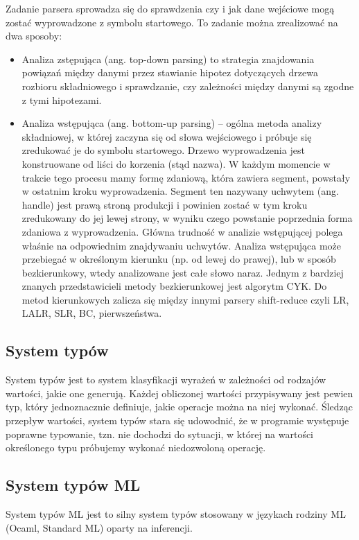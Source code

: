 \documentclass{article}
\begin{document}
\newpage
Zadanie parsera sprowadza się do sprawdzenia czy i jak dane wejściowe mogą zostać wyprowadzone z symbolu startowego. To zadanie można zrealizować na dwa sposoby:


\begin{itemize}
  \item Analiza zstępująca (ang. top-down parsing) to strategia znajdowania powiązań między danymi przez stawianie hipotez dotyczących drzewa rozbioru składniowego i sprawdzanie, czy zależności między danymi są zgodne z tymi hipotezami.
  \item Analiza wstępująca (ang. bottom-up parsing) – ogólna metoda analizy składniowej, w której zaczyna się od słowa wejściowego i próbuje się zredukować je do symbolu startowego. Drzewo wyprowadzenia jest konstruowane od liści do korzenia (stąd nazwa). W każdym momencie w trakcie tego procesu mamy formę zdaniową, która zawiera segment, powstały w ostatnim kroku wyprowadzenia. Segment ten nazywany uchwytem (ang. handle) jest prawą stroną produkcji i powinien zostać w tym kroku zredukowany do jej lewej strony, w wyniku czego powstanie poprzednia forma zdaniowa z wyprowadzenia. Główna trudność w analizie wstępującej polega właśnie na odpowiednim znajdywaniu uchwytów.
        Analiza wstępująca może przebiegać w określonym kierunku (np. od lewej do prawej), lub w sposób bezkierunkowy, wtedy analizowane jest całe słowo naraz. Jednym z bardziej znanych przedstawicieli metody bezkierunkowej jest algorytm CYK. Do metod kierunkowych zalicza się między innymi parsery shift-reduce czyli LR, LALR, SLR, BC, pierwszeństwa.
\end{itemize}



\subsection{System typów}
System typów jest to system klasyfikacji wyrażeń w zależności od rodzajów wartości, jakie one generują\cite{Pierce__Benjamin__C__2002}. Każdej obliczonej wartości przypisywany jest pewien typ, który jednoznacznie definiuje, jakie operacje można na niej wykonać. Śledząc przepływ wartości, system typów stara się udowodnić, że w programie występuje poprawne typowanie, tzn. nie dochodzi do sytuacji, w której na wartości określonego typu próbujemy wykonać niedozwoloną operację.
\subsection{System typów ML} System typów ML jest to silny system typów stosowany w językach rodziny ML (Ocaml, Standard ML) oparty na inferencji.
\end{document}
